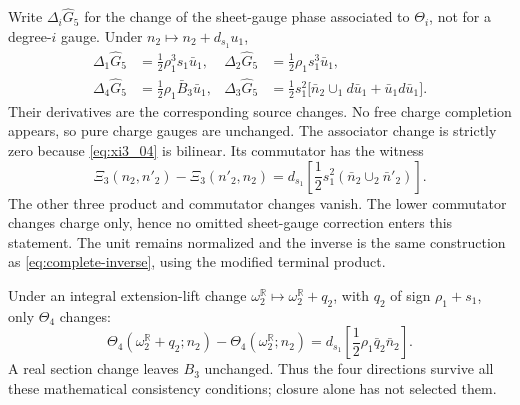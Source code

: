 Write $\Delta_i\widehat G_5$ for the change of the sheet-gauge phase associated to $\Theta_i$, not for a degree-$i$ gauge. Under $n_2\mapsto n_2+d_{s_1}u_1$,
\begin{align}\label{eq:theta-gauges}
\Delta_1\widehat G_5&=\frac12\rho_1^3s_1\bar u_1,
&\Delta_2\widehat G_5&=\frac12\rho_1s_1^3\bar u_1,\nonumber\\
\Delta_4\widehat G_5&=\frac12\rho_1\bar B_3\bar u_1,
&\Delta_3\widehat G_5&=\frac12s_1^2\big[\bar n_2\cup_1d\bar u_1+\bar u_1d\bar u_1\big].
\end{align}
Their derivatives are the corresponding source changes. No free charge completion appears, so pure charge gauges are unchanged. The associator change is strictly zero because \eqref{eq:xi3_04} is bilinear. Its commutator has the witness
\begin{equation}\label{eq:theta-exchange}
 \Xi_3(n_2,n'_2)-\Xi_3(n'_2,n_2)
 =d_{s_1}\left[\frac12s_1^2(\bar n_2\cup_2\bar n'_2)\right].
\end{equation}
The other three product and commutator changes vanish. The lower commutator changes charge only, hence no omitted sheet-gauge correction enters this statement. The unit remains normalized and the inverse is the same construction as \eqref{eq:complete-inverse}, using the modified terminal product.

Under an integral extension-lift change $\omega_2^{\mathbb R}\mapsto\omega_2^{\mathbb R}+q_2$, with $q_2$ of sign $\rho_1+s_1$, only $\Theta_4$ changes:
\begin{equation}\label{eq:theta4lift04}
 \Theta_4(\omega_2^{\mathbb R}+q_2;n_2)-\Theta_4(\omega_2^{\mathbb R};n_2)
 =d_{s_1}\left[\frac12\rho_1\bar q_2\bar n_2\right].
\end{equation}
A real section change leaves $B_3$ unchanged. Thus the four directions survive all these mathematical consistency conditions; closure alone has not selected them.

